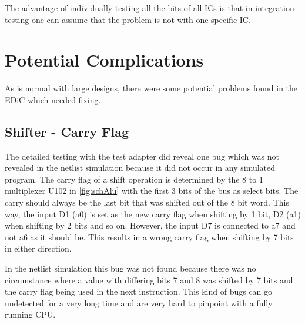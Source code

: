 The advantage of individually testing all the bits of all \glspl{IC} is that in integration testing one can assume that the problem is not with one specific \gls{IC}.
\section{Potential Complications}\label{sec:switchGlitch}
As is normal with large designs, there were some potential problems found in the \gls{EDiC} which needed fixing.
\subsection{Shifter - Carry Flag}
The detailed testing with the test adapter did reveal one bug which was not revealed in the netlist simulation because it did not occur in any simulated program.
The carry flag of a shift operation is determined by the 8 to 1 multiplexer U102 in \cref{fig:schAlu} with the first 3 bits of the bus as select bits.
The carry should always be the last bit that was shifted out of the 8 bit word.
This way, the input D1 (a0) is set as the new carry flag when shifting by 1 bit, D2 (a1) when shifting by 2 bits and so on.
However, the input D7 is connected to a7 and not a6 as it should be.
This results in a wrong carry flag when shifting by 7 bits in either direction.

In the netlist simulation this bug was not found because there was no circumstance where a value with differing bits 7 and 8 was shifted by 7 bits and the carry flag being used in the next instruction.
This kind of bugs can go undetected for a very long time and are very hard to pinpoint with a fully running \gls{CPU}.


